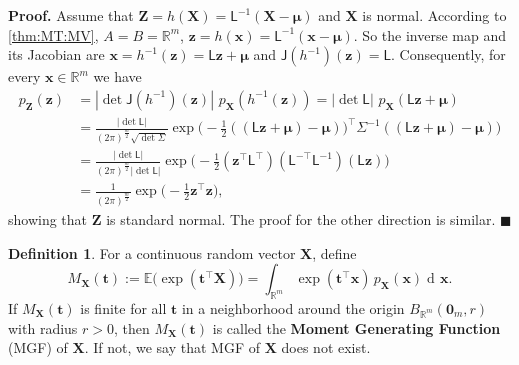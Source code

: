 \documentclass[10pt]{article}
\theoremstyle{definition}
\newtheorem{defn}{Definition}[section]
\newenvironment{prf}{\noindent\textbf{Proof.}}{\hfill$\blacksquare$}
\DeclareMathOperator{\df}{d\!}
\begin{document}
\begin{prf}
Assume that $\mathbf{Z}=h(\mathbf{X})=\mathsf{L}^{-1}(\mathbf{X}-\boldsymbol{\mu})$ and $\mathbf{X}$ is normal. According to \cref{thm:MT:MV}, $A=B=\mathbb{R}^m$, $\mathbf{z}=h(\mathbf{x})=\mathsf{L}^{-1}(\mathbf{x}-\boldsymbol{\mu})$. So the inverse map and its Jacobian are  $\mathbf{x}=h^{-1}(\mathbf{z})=\mathsf{L}\mathbf{z}+\boldsymbol{\mu}$ and $\mathsf{J}(h^{-1})(\mathbf{z}) = \mathsf{L}$. Consequently, for every $\mathbf{x}\in\mathbb{R}^m$ we have
\begin{align*}
p_{\mathbf{Z}}(\mathbf{z}) &= |\det\mathsf{J}(h^{-1})(\mathbf{z})| \,\, p_{\mathbf{X}}(h^{-1}(\mathbf{z}))  = |\det\mathsf{L}|\,\, p_{\mathbf{X}}(\mathsf{L}\mathbf{z}+\boldsymbol{\mu}) \\
&= \frac{|\det\mathsf{L}|}{(2\pi)^{\frac{m}{2}} \sqrt{\det\mathsf{\Sigma}}} \exp \Big(-\frac{1}{2} ((\mathsf{L}\mathbf{z}+\boldsymbol{\mu})-\boldsymbol{\mu}))^{\top}\mathsf{\Sigma}^{-1}((\mathsf{L}\mathbf{z}+\boldsymbol{\mu})-\boldsymbol{\mu}) \Big)\\
&= \frac{|\det\mathsf{L}|}{(2\pi)^{\frac{m}{2}}|\det\mathsf{L}|} \exp \Big(-\frac{1}{2} (\mathbf{z}^{\top}\mathsf{L}^{\top})(\mathsf{L}^{-\top} \mathsf{L}^{-1})(\mathsf{L}\mathbf{z}) \Big)\\
&=\frac{1}{(2\pi)^{\frac{m}{2}}} \exp \Big(-\frac{1}{2} \mathbf{z}^{\top} \mathbf{z} \Big),
\end{align*}
showing that $\mathbf{Z}$ is standard normal. The proof for the other direction is similar.
\end{prf}
\begin{defn}
For a continuous random vector $\mathbf{X}$, define
\begin{equation}
M_{\mathbf{X}}(\mathbf{t})  
:= \mathbb{E}\big(\exp(\mathbf{t}^\top\mathbf{X})\big)
= \int_{\mathbb{R}^m}\exp(\mathbf{t}^{\top}\mathbf{x})\,p_{\mathbf{X}}(\mathbf{x})\df\mathbf{x}.
\end{equation}
If $M_{\mathbf{X}}(\mathbf{t})$ is finite for all $\mathbf{t}$ in a neighborhood around the origin $B_{\mathbb{R}^m}(\mathbf{0}_m, r)$ with radius $r>0$, then $M_{\mathbf{X}}(\mathbf{t})$ is called the \textbf{Moment Generating Function} (MGF) of $\mathbf{X}$. If not, we say that MGF of  $\mathbf{X}$ does not exist.
\end{defn}
\end{document}

